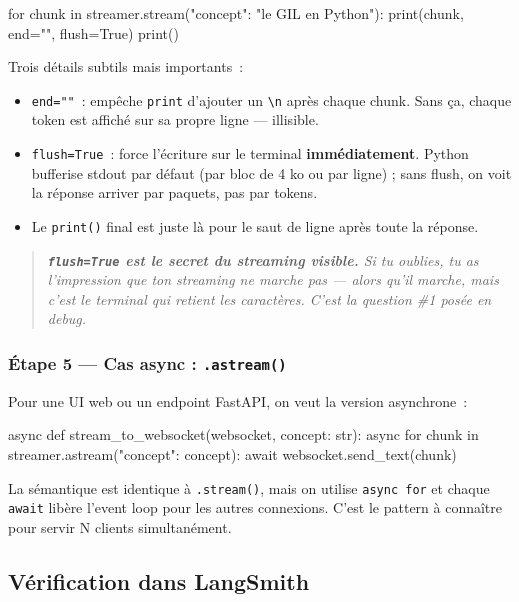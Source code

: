 \documentclass[11pt,a4paper]{article}
\begin{document}
\begin{pythoncode}
for chunk in streamer.stream({"concept": "le GIL en Python"}):
    print(chunk, end="", flush=True)
print()
\end{pythoncode}

Trois détails subtils mais importants~:

\begin{itemize}[leftmargin=*]
  \item \texttt{end=""}~: empêche \texttt{print} d'ajouter un \texttt{\textbackslash n} après
        chaque chunk. Sans ça, chaque token est affiché sur sa propre
        ligne — illisible.
  \item \texttt{flush=True}~: force l'écriture sur le terminal
        \textbf{immédiatement}. Python bufferise stdout par défaut (par
        bloc de 4 ko ou par ligne) ; sans flush, on voit la réponse arriver
        par paquets, pas par tokens.
  \item Le \texttt{print()} final est juste là pour le saut de ligne après
        toute la réponse.
\end{itemize}

\begin{quote}\itshape
\textbf{\texttt{flush=True} est le secret du streaming visible.} Si tu
oublies, tu as l'impression que ton streaming ne marche pas — alors qu'il
marche, mais c'est le terminal qui retient les caractères. C'est la
question \#1 posée en debug.
\end{quote}

\subsubsection*{Étape 5 — Cas async : \texttt{.astream()}}

Pour une UI web ou un endpoint FastAPI, on veut la version asynchrone~:

\begin{pythoncode}
async def stream_to_websocket(websocket, concept: str):
    async for chunk in streamer.astream({"concept": concept}):
        await websocket.send_text(chunk)
\end{pythoncode}

La sémantique est identique à \texttt{.stream()}, mais on utilise
\texttt{async for} et chaque \texttt{await} libère l'event loop pour les
autres connexions. C'est le pattern à connaître pour servir N clients
simultanément.

\subsection{Vérification dans LangSmith}
\end{document}
